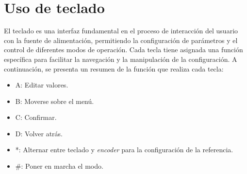 \section{Uso de teclado} 
El teclado es una interfaz fundamental en el proceso de interacción del usuario con la fuente de alimentación, permitiendo la configuración de parámetros y el control de diferentes modos de operación. Cada tecla tiene asignada una función específica para facilitar la navegación y la manipulación de la configuración. A continuación, se presenta un resumen de la función que realiza cada tecla:
\begin{itemize}
    \item A: Editar valores.
    \item B: Moverse sobre el menú.
    \item C: Confirmar.
    \item D: Volver atrás.
    \item *: Alternar entre teclado y \textit{encoder} para la configuración de la referencia.
    \item \#: Poner en marcha el modo.
\end{itemize}

